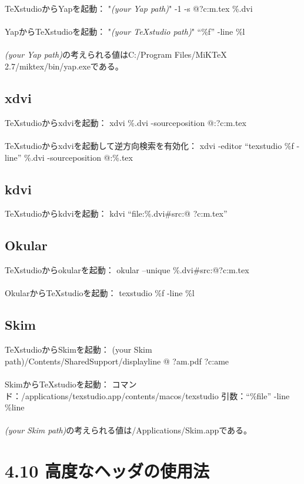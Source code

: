 \documentclass[]{book}
\begin{document}
TeXstudioからYapを起動： "\emph{(your Yap path)}" -1 -s @?c:m.tex \%.dvi
\\\\ YapからTeXstudioを起動： "\emph{(your TeXstudio path)}" ``\%f''
-line \%l \\\\ \emph{(your Yap path)}の考えられる値はC:/Program
Files/MiKTeX 2.7/miktex/bin/yap.exeである。

\subsection{xdvi}

TeXstudioからxdviを起動： xdvi \%.dvi -sourceposition @:?c:m.tex\\\\
TeXstudioからxdviを起動して逆方向検索を有効化： xdvi -editor ``texstudio
\%f -line'' \%.dvi -sourceposition @:\%.tex

\subsection{kdvi}

TeXstudioからkdviを起動： kdvi ``file:\%.dvi\#src:@ ?c:m.tex''

\subsection{Okular}

TeXstudioからokularを起動： okular --unique \%.dvi\#src:@?c:m.tex\\\\
OkularからTeXstudioを起動： texstudio \%f -line \%l

\subsection{Skim}

TeXstudioからSkimを起動： (your Skim
path)/Contents/SharedSupport/displayline @ ?am.pdf ?c:ame\\\\
SkimからTeXstudioを起動：
コマンド：/applications/texstudio.app/contents/macos/texstudio
引数：``\%file'' -line \%line \\\\ \emph{(your Skim
path)}の考えられる値は/Applications/Skim.appである。

\section{4.10 高度なヘッダの使用法}
\end{document}
